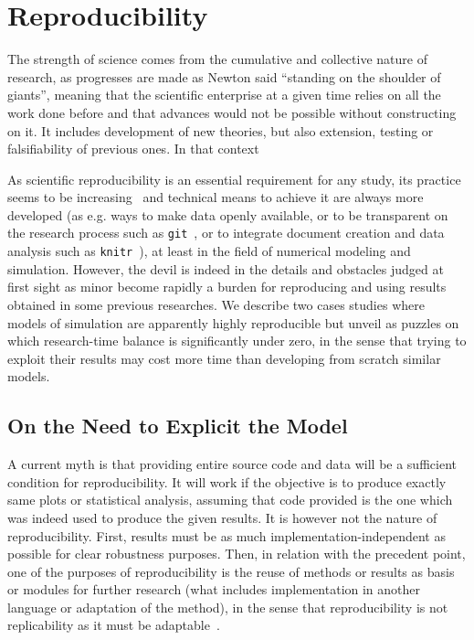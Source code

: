 
\newpage



\section{Reproducibility}




The strength of science comes from the cumulative and collective nature of research, as progresses are made as Newton said ``standing on the shoulder of giants'', meaning that the scientific enterprise at a given time relies on all the work done before and that advances would not be possible without constructing on it. It includes development of new theories, but also extension, testing or falsifiability of previous ones. In that context 





As scientific reproducibility is an essential requirement for any study, its practice seems to be increasing~\cite{stodden2010scientific} and technical means to achieve it are always more developed (as e.g. ways to make data openly available, or to be transparent on the research process such as \texttt{git}~\cite{ram2013git}, or to integrate document creation and data analysis such as \texttt{knitr}~\cite{xie2013knitr}), at least in the field of numerical modeling and simulation. However, the devil is indeed in the details and obstacles judged at first sight as minor become rapidly a burden for reproducing and using results obtained in some previous researches. We describe two cases studies where models of simulation are apparently highly reproducible but unveil as puzzles on which research-time balance is significantly under zero, in the sense that trying to exploit their results may cost more time than developing from scratch similar models.






\subsection{On the Need to Explicit the Model}

A current myth is that providing entire source code and data will be a sufficient condition for reproducibility. It will work if the objective is to produce exactly same plots or statistical analysis, assuming that code provided is the one which was indeed used to produce the given results. It is however not the nature of reproducibility. First, results must be as much implementation-independent as possible for clear robustness purposes. Then, in relation with the precedent point, one of the purposes of reproducibility is the reuse of methods or results as basis or modules for further research (what includes implementation in another language or adaptation of the method), in the sense that reproducibility is not replicability as it must be adaptable~\cite{drummond2009replicability}.

